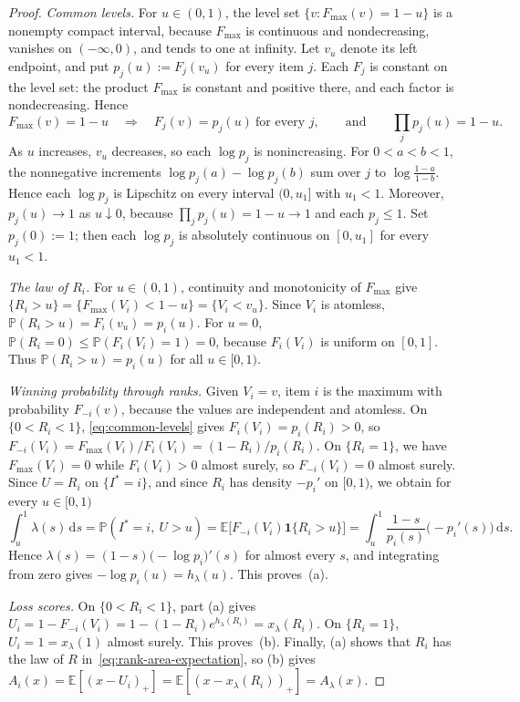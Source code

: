 \documentclass[11pt]{article}
\theoremstyle{definition}
\theoremstyle{remark}
\newcommand{\Pp}{\mathbb P}
\newcommand{\E}{\mathbb E}
\newcommand{\dd}{\,\mathrm d}
\newcommand{\ind}{\mathbf 1}
\begin{document}
\begin{proof}
\emph{Common levels.}
For $u\in(0,1)$, the level set $\{v:F_{\max}(v)=1-u\}$ is a nonempty compact interval, because $F_{\max}$ is continuous and nondecreasing, vanishes on $(-\infty,0)$, and tends to one at infinity.
Let $v_u$ denote its left endpoint, and put $p_j(u):=F_j(v_u)$ for every item $j$.
Each $F_j$ is constant on the level set: the product $F_{\max}$ is constant and positive there, and each factor is nondecreasing.
Hence
\begin{equation}\label{eq:common-levels}
 F_{\max}(v)=1-u
 \quad\Longrightarrow\quad
 F_j(v)=p_j(u)\ \text{for every }j,
 \qquad\text{and}\qquad
 \prod_jp_j(u)=1-u.
\end{equation}
As $u$ increases, $v_u$ decreases, so each $\log p_j$ is nonincreasing.
For $0<a<b<1$, the nonnegative increments $\log p_j(a)-\log p_j(b)$ sum over $j$ to $\log\frac{1-a}{1-b}$.
Hence each $\log p_j$ is Lipschitz on every interval $(0,u_1]$ with $u_1<1$.
Moreover, $p_j(u)\to1$ as $u\downarrow0$, because $\prod_jp_j(u)=1-u\to1$ and each $p_j\le1$.
Set $p_j(0):=1$; then each $\log p_j$ is absolutely continuous on $[0,u_1]$ for every $u_1<1$.

\emph{The law of $R_i$.}
For $u\in(0,1)$, continuity and monotonicity of $F_{\max}$ give $\{R_i>u\}=\{F_{\max}(V_i)<1-u\}=\{V_i<v_u\}$.
Since $V_i$ is atomless, $\Pp(R_i>u)=F_i(v_u)=p_i(u)$.
For $u=0$, $\Pp(R_i=0)\le\Pp(F_i(V_i)=1)=0$, because $F_i(V_i)$ is uniform on $[0,1]$.
Thus $\Pp(R_i>u)=p_i(u)$ for all $u\in[0,1)$.

\emph{Winning probability through ranks.}
Given $V_i=v$, item $i$ is the maximum with probability $F_{-i}(v)$, because the values are independent and atomless.
On $\{0<R_i<1\}$, \eqref{eq:common-levels} gives $F_i(V_i)=p_i(R_i)>0$, so $F_{-i}(V_i)=F_{\max}(V_i)/F_i(V_i)=(1-R_i)/p_i(R_i)$.
On $\{R_i=1\}$, we have $F_{\max}(V_i)=0$ while $F_i(V_i)>0$ almost surely, so $F_{-i}(V_i)=0$ almost surely.
Since $U=R_i$ on $\{I^*=i\}$, and since $R_i$ has density $-p_i'$ on $[0,1)$, we obtain for every $u\in[0,1)$
\[
 \int_u^1\lambda(s)\dd s
 =\Pp(I^*=i,\ U>u)
 =\E\bigl[F_{-i}(V_i)\ind\{R_i>u\}\bigr]
 =\int_u^1\frac{1-s}{p_i(s)}\bigl(-p_i'(s)\bigr)\dd s.
\]
Hence $\lambda(s)=(1-s)\bigl(-\log p_i\bigr)'(s)$ for almost every $s$, and integrating from zero gives $-\log p_i(u)=h_\lambda(u)$.
This proves~(a).

\emph{Loss scores.}
On $\{0<R_i<1\}$, part (a) gives $U_i=1-F_{-i}(V_i)=1-(1-R_i)e^{h_\lambda(R_i)}=x_\lambda(R_i)$.
On $\{R_i=1\}$, $U_i=1=x_\lambda(1)$ almost surely.
This proves~(b).
Finally, (a) shows that $R_i$ has the law of $R$ in~\eqref{eq:rank-area-expectation}, so (b) gives $A_i(x)=\E[(x-U_i)_+]=\E[(x-x_\lambda(R_i))_+]=A_\lambda(x)$.
\end{proof}
\end{document}
